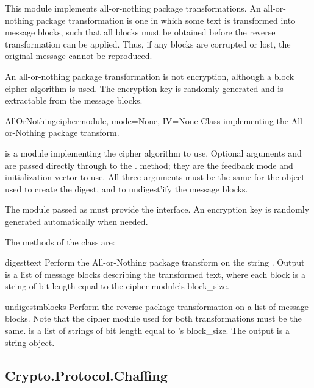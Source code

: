 \documentclass{howto}
\begin{document}
This module implements all-or-nothing package transformations.
An all-or-nothing package transformation is one in which some text is
transformed into message blocks, such that all blocks must be obtained before
the reverse transformation can be applied.  Thus, if any blocks are corrupted
or lost, the original message cannot be reproduced.

An all-or-nothing package transformation is not encryption, although a block
cipher algorithm is used.  The encryption key is randomly generated and is
extractable from the message blocks.

\begin{classdesc}{AllOrNothing}{ciphermodule, mode=None, IV=None}
Class implementing the All-or-Nothing package transform.

 is a module implementing the cipher algorithm to
use.  Optional arguments  and  are passed directly
through to the . method; they are the
feedback mode and initialization vector to use.  All three arguments
must be the same for the object used to create the digest, and to
undigest'ify the message blocks.

The module passed as  must provide the 
interface.  An encryption key is randomly generated automatically when
needed.
\end{classdesc}

The methods of the  class are:

\begin{methoddesc}{digest}{text}
Perform the All-or-Nothing package transform on the 
string .  Output is a list of message blocks describing the
transformed text, where each block is a string of bit length equal
to the cipher module's block_size.
\end{methoddesc}

\begin{methoddesc}{undigest}{mblocks}
Perform the reverse package transformation on a list of message
blocks.  Note that the cipher module used for both transformations
must be the same.   is a list of strings of bit length
equal to 's block_size.  The output is a string object.
\end{methoddesc}


\subsection{Crypto.Protocol.Chaffing}
\end{document}
